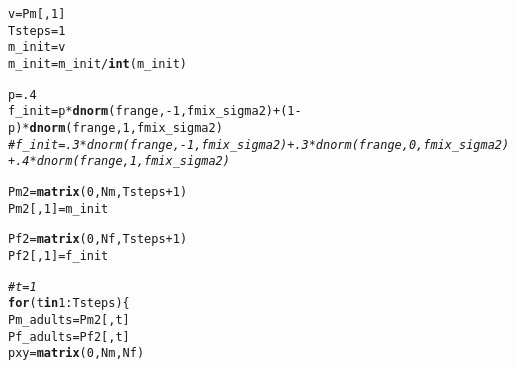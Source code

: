 \documentclass{article}\usepackage[]{graphicx}\usepackage[]{color}
\makeatletter
\newcommand{\hlnum}[1]{\textcolor[rgb]{0.686,0.059,0.569}{#1}}%
\newcommand{\hlcom}[1]{\textcolor[rgb]{0.678,0.584,0.686}{\textit{#1}}}%
\newcommand{\hlopt}[1]{\textcolor[rgb]{0,0,0}{#1}}%
\newcommand{\hlstd}[1]{\textcolor[rgb]{0.345,0.345,0.345}{#1}}%
\newcommand{\hlkwa}[1]{\textcolor[rgb]{0.161,0.373,0.58}{\textbf{#1}}}%
\newcommand{\hlkwb}[1]{\textcolor[rgb]{0.69,0.353,0.396}{#1}}%
\newcommand{\hlkwd}[1]{\textcolor[rgb]{0.737,0.353,0.396}{\textbf{#1}}}%
\newenvironment{kframe}{%
 \def\at@end@of@kframe{}%
 \ifinner\ifhmode%
  \def\at@end@of@kframe{\end{minipage}}%
  \begin{minipage}{\columnwidth}%
 \fi\fi%
 \def\FrameCommand##1{\hskip\@totalleftmargin \hskip-\fboxsep
 \colorbox{shadecolor}{##1}\hskip-\fboxsep
     \hskip-\linewidth \hskip-\@totalleftmargin \hskip\columnwidth}%
 \MakeFramed {\advance\hsize-\width
   \@totalleftmargin\z@ \linewidth\hsize
   \@setminipage}}%
 {\par\unskip\endMakeFramed%
 \at@end@of@kframe}
\newenvironment{knitrout}{}{} %
\makeatother
\begin{document}
\begin{knitrout}
\color{fgcolor}\begin{kframe}
\begin{alltt}
\hlstd{v} \hlkwb{=} \hlstd{Pm[,}\hlnum{1}\hlstd{]}
\hlstd{Tsteps} \hlkwb{=} \hlnum{1}
\hlstd{m_init} \hlkwb{=} \hlstd{v}
\hlstd{m_init} \hlkwb{=} \hlstd{m_init}\hlopt{/}\hlkwd{int}\hlstd{(m_init)}

\hlstd{p} \hlkwb{=} \hlnum{.4}
\hlstd{f_init} \hlkwb{=} \hlstd{p}\hlopt{*}\hlkwd{dnorm}\hlstd{(frange,}\hlopt{-}\hlnum{1}\hlstd{,fmix_sigma2)}\hlopt{+}\hlstd{(}\hlnum{1}\hlopt{-}\hlstd{p)}\hlopt{*}\hlkwd{dnorm}\hlstd{(frange,}\hlnum{1}\hlstd{,fmix_sigma2)}
\hlcom{# f_init = .3*dnorm(frange,-1,fmix_sigma2)+.3*dnorm(frange,0,fmix_sigma2)+.4*dnorm(frange,1,fmix_sigma2)}

\hlstd{Pm2} \hlkwb{=} \hlkwd{matrix}\hlstd{(}\hlnum{0}\hlstd{,Nm,Tsteps}\hlopt{+}\hlnum{1}\hlstd{)}
\hlstd{Pm2[,}\hlnum{1}\hlstd{]} \hlkwb{=} \hlstd{m_init}

\hlstd{Pf2} \hlkwb{=} \hlkwd{matrix}\hlstd{(}\hlnum{0}\hlstd{,Nf,Tsteps}\hlopt{+}\hlnum{1}\hlstd{)}
\hlstd{Pf2[,}\hlnum{1}\hlstd{]} \hlkwb{=} \hlstd{f_init}

\hlcom{# t = 1}
\hlkwa{for}\hlstd{(t} \hlkwa{in} \hlnum{1}\hlopt{:}\hlstd{Tsteps)\{}
        \hlstd{Pm_adults} \hlkwb{=} \hlstd{Pm2[,t]}
        \hlstd{Pf_adults} \hlkwb{=} \hlstd{Pf2[,t]}
        \hlstd{pxy} \hlkwb{=} \hlkwd{matrix}\hlstd{(}\hlnum{0}\hlstd{,Nm,Nf)}


\end{alltt}
\end{kframe}
\end{knitrout}
\end{document}
